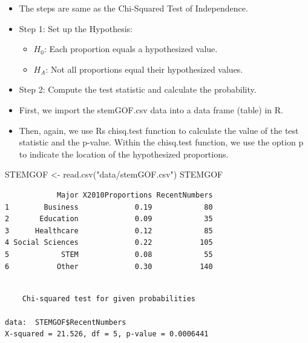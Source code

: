 \documentclass[
  letterpaper,
  DIV=11,
  numbers=noendperiod]{scrreprt}
\newenvironment{Shaded}{\begin{snugshade}}{\end{snugshade}}
\newcommand{\AttributeTok}[1]{\textcolor[rgb]{0.40,0.45,0.13}{#1}}
\newcommand{\FunctionTok}[1]{\textcolor[rgb]{0.28,0.35,0.67}{#1}}
\newcommand{\NormalTok}[1]{\textcolor[rgb]{0.00,0.23,0.31}{#1}}
\newcommand{\OtherTok}[1]{\textcolor[rgb]{0.00,0.23,0.31}{#1}}
\newcommand{\SpecialCharTok}[1]{\textcolor[rgb]{0.37,0.37,0.37}{#1}}
\newcommand{\StringTok}[1]{\textcolor[rgb]{0.13,0.47,0.30}{#1}}
\providecommand{\tightlist}{%
  \setlength{\itemsep}{0pt}\setlength{\parskip}{0pt}}\usepackage{longtable,booktabs,array}
\begin{document}
\begin{itemize}
\tightlist
\item
  The steps are same as the Chi-Squared Test of Independence.
\item
  Step 1: Set up the Hypothesis:

  \begin{itemize}
  \tightlist
  \item
    \(𝐻_0\): Each proportion equals a hypothesized value.
  \item
    \(𝐻_A\): Not all proportions equal their hypothesized values.
  \end{itemize}
\item
  Step 2: Compute the test statistic and calculate the probability.
\item
  First, we import the stemGOF.csv data into a data frame (table) in R.
\item
  Then, again, we use Rs chisq.test function to calculate the value of
  the test statistic and the p-value. Within the chisq.test function, we
  use the option p to indicate the location of the hypothesized
  proportions.
\end{itemize}

\begin{Shaded}
\begin{Highlighting}[]
\NormalTok{STEMGOF }\OtherTok{\textless{}{-}} \FunctionTok{read.csv}\NormalTok{(}\StringTok{"data/stemGOF.csv"}\NormalTok{)}
\NormalTok{STEMGOF}
\end{Highlighting}
\end{Shaded}

\begin{verbatim}
            Major X2010Proportions RecentNumbers
1        Business             0.19            80
2       Education             0.09            35
3      Healthcare             0.12            85
4 Social Sciences             0.22           105
5            STEM             0.08            55
6           Other             0.30           140
\end{verbatim}

\begin{Shaded}
\end{Shaded}

\begin{verbatim}

    Chi-squared test for given probabilities

data:  STEMGOF$RecentNumbers
X-squared = 21.526, df = 5, p-value = 0.0006441
\end{verbatim}
\end{document}
